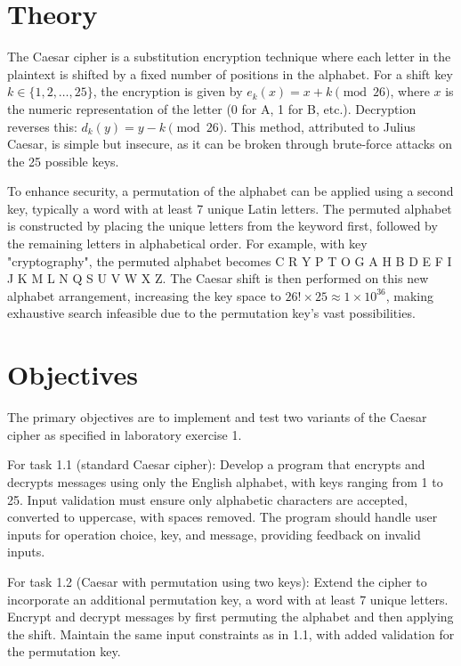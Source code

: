 \section{Theory}

The Caesar cipher is a substitution encryption technique where each letter in the plaintext is shifted by a fixed number of positions in the alphabet. For a shift key $k \in \{1, 2, \dots, 25\}$, the encryption is given by $e_k(x) = x + k \pmod{26}$, where $x$ is the numeric representation of the letter (0 for A, 1 for B, etc.). Decryption reverses this: $d_k(y) = y - k \pmod{26}$. This method, attributed to Julius Caesar, is simple but insecure, as it can be broken through brute-force attacks on the 25 possible keys.

To enhance security, a permutation of the alphabet can be applied using a second key, typically a word with at least 7 unique Latin letters. The permuted alphabet is constructed by placing the unique letters from the keyword first, followed by the remaining letters in alphabetical order. For example, with key "cryptography", the permuted alphabet becomes C R Y P T O G A H B D E F I J K M L N Q S U V W X Z. The Caesar shift is then performed on this new alphabet arrangement, increasing the key space to $26! \times 25 \approx 1 \times 10^{36}$, making exhaustive search infeasible due to the permutation key's vast possibilities.

\section{Objectives}

The primary objectives are to implement and test two variants of the Caesar cipher as specified in laboratory exercise 1.

For task 1.1 (standard Caesar cipher): Develop a program that encrypts and decrypts messages using only the English alphabet, with keys ranging from 1 to 25. Input validation must ensure only alphabetic characters are accepted, converted to uppercase, with spaces removed. The program should handle user inputs for operation choice, key, and message, providing feedback on invalid inputs.

For task 1.2 (Caesar with permutation using two keys): Extend the cipher to incorporate an additional permutation key, a word with at least 7 unique letters. Encrypt and decrypt messages by first permuting the alphabet and then applying the shift. Maintain the same input constraints as in 1.1, with added validation for the permutation key.

